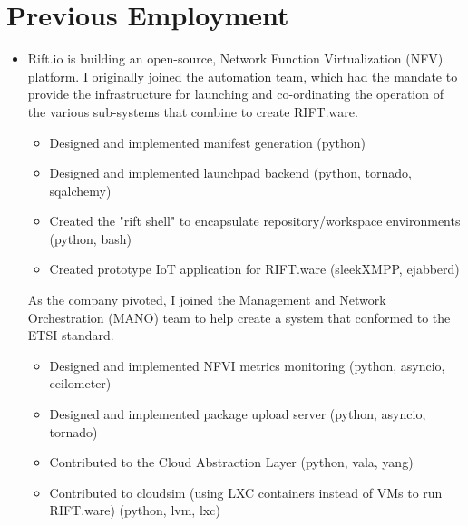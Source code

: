 \documentclass[11pt,a4paper,sans]{moderncv}        %
\begin{document}
\makecvtitle

\section{Previous Employment}

\vspace{6pt}

\begin{itemize}

\item{}

  Rift.io is building an open-source, Network Function Virtualization (NFV)
  platform. I originally joined the automation team, which had the mandate to
  provide the infrastructure for launching and co-ordinating the operation of
  the various sub-systems that combine to create RIFT.ware.

  \begin{itemize}
    \item{Designed and implemented manifest generation (python)}
    \item{Designed and implemented launchpad backend (python, tornado, sqalchemy)}
    \item{Created the "rift shell" to encapsulate repository/workspace environments (python, bash)}
    \item{Created prototype IoT application for RIFT.ware (sleekXMPP, ejabberd)}
  \end{itemize}

  As the company pivoted, I joined the Management and Network Orchestration
  (MANO) team to help create a system that conformed to the ETSI standard.

  \begin{itemize}
    \item{Designed and implemented NFVI metrics monitoring (python, asyncio, ceilometer)}
    \item{Designed and implemented package upload server (python, asyncio, tornado)}
    \item{Contributed to the Cloud Abstraction Layer (python, vala, yang)}
    \item{Contributed to cloudsim (using LXC containers instead of VMs to run RIFT.ware) (python, lvm, lxc)}
  \end{itemize}

\end{itemize}
\end{document}

